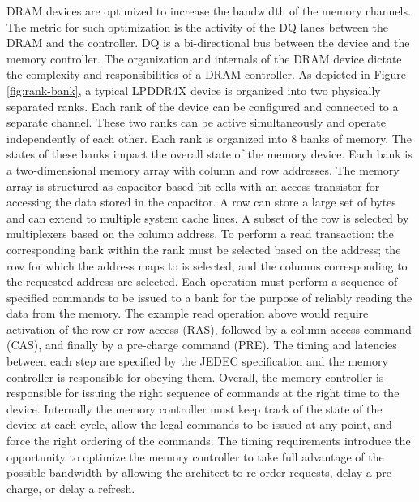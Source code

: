 DRAM devices are optimized to increase the bandwidth of the memory channels. The metric for such optimization is the activity of the DQ lanes between the DRAM and the controller. DQ is a bi-directional bus between the device and the memory controller. The organization and internals of the DRAM device dictate the complexity and responsibilities of a DRAM controller. As depicted in Figure \ref{fig:rank-bank}, a typical LPDDR4X device is organized into two physically separated ranks. Each rank of the device can be configured and connected to a separate channel. These two ranks can be active simultaneously and operate independently of each other. Each rank is organized into 8 banks of memory. The states of these banks impact the overall state of the memory device. Each bank is a two-dimensional memory array with column and row addresses. The memory array is structured as capacitor-based bit-cells with an access transistor for accessing the data stored in the capacitor. A row can store a large set of bytes and can extend to multiple system cache lines. A subset of the row is selected by multiplexers based on the column address. To perform a read transaction: the corresponding bank within the rank must be selected based on the address; the row for which the address maps to is selected, and the columns corresponding to the requested address are selected. Each operation must perform a sequence of specified commands to be issued to a bank for the purpose of reliably reading the data from the memory. The example read operation above would require activation of the row or row access (RAS), followed by a column access command (CAS), and finally by a pre-charge command (PRE). The timing and latencies between each step are specified by the JEDEC specification and the memory controller is responsible for obeying them. Overall, the memory controller is responsible for issuing the right sequence of commands at the right time to the device. Internally the memory controller must keep track of the state of the device at each cycle, allow the legal commands to be issued at any point, and force the right ordering of the commands. The timing requirements introduce the opportunity to optimize the memory controller to take full advantage of the possible bandwidth by allowing the architect to re-order requests, delay a pre-charge, or delay a refresh.
